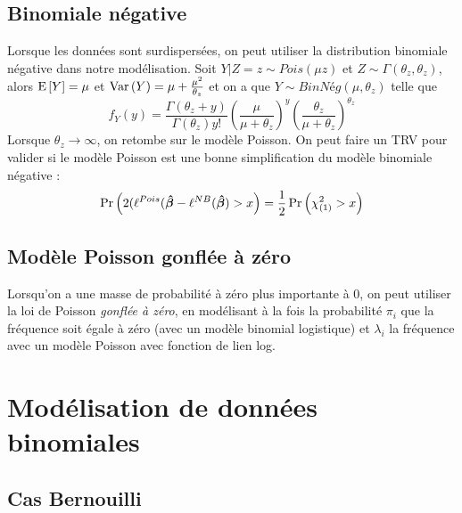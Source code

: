 \documentclass[10pt, french]{article}
\begin{document}
\begin{multicols*}{3}
\subsection*{Binomiale négative}
Lorsque les données sont surdispersées, on peut utiliser la distribution binomiale négative dans notre modélisation. Soit $Y | Z = z \sim Pois(\mu z)$ et $Z \sim \Gamma(\theta_z, \theta_z)$, alors $\mathrm{E} \left[ Y \right] = \mu$ et $\mathrm{Var} \left( Y \right) = \mu + \frac{\mu^2}{\theta_z}$ et on a que $Y \sim BinNég(\mu, \theta_z)$ telle que
\[f_Y(y) = \frac{\Gamma(\theta_z + y)}{\Gamma(\theta_z) y!} \left( \frac{\mu}{\mu + \theta_z} \right)^{y} \left( \frac{\theta_z}{\mu + \theta_z} \right)^{\theta_z}  \]
Lorsque $\theta_z \to \infty$, on retombe sur le modèle Poisson. On peut faire un TRV pour valider si le modèle Poisson est une bonne simplification du modèle binomiale négative : 
\[ \Pr \left(  2(\ell^{Pois}(\bm{\hat{\beta}} - \ell^{NB}(\bm{\hat{\beta}}) > x \right) = \frac{1}{2} \Pr \left( \chi_{(1)}^2 > x \right) \] 

\subsection*{Modèle Poisson gonflée à zéro}
Lorsqu'on a une masse de probabilité à zéro plus importante à 0, on peut utiliser la loi de Poisson \emph{gonflée à zéro}, en modélisant à la fois la probabilité $\pi_i$ que la fréquence soit égale à zéro (avec un modèle binomial logistique) et $\lambda_i$ la fréquence avec un modèle Poisson avec fonction de lien log.


\section{Modélisation de données binomiales}





\subsection{Cas Bernouilli}


\end{multicols*}
\end{document}
